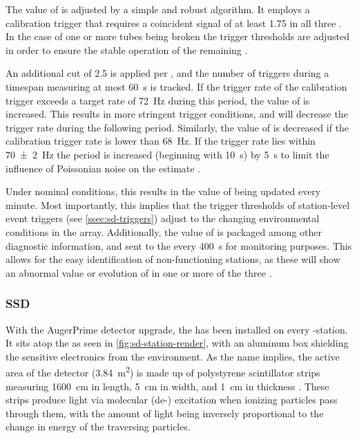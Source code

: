 The value of \VemOnline is adjusted by a simple and robust algorithm. It employs
a calibration trigger that requires a coincident signal of at least 
\SI{1.75}{\VemOnline} in all three \LPMTs. In the case of one or more tubes
being broken the trigger thresholds are adjusted in order to ensure the stable 
operation of the remaining \PMTs 
\cite{convengaLocalStationCalibrationDummies2023}.

An additional cut of \SI{2.5}{\VemOnline} is applied per \LPMT, and the number 
of triggers during a timespan measuring at most \SI{60}{\second} is tracked. If
the trigger rate of the calibration trigger exceeds a target rate of 
\SI{72}{\hertz} during this period, the value of \VemOnline is increased. This 
results in more stringent trigger conditions, and will decrease the trigger rate
during the following \DAQ period. Similarly, the value of \VemOnline is 
decreased if the calibration trigger rate is lower than \SI{68}{\hertz}. If the 
trigger rate lies within \SI{70\pm2}{\hertz} the \DAQ period is increased 
(beginning with \SI{10}{\second}) by \SI{5}{\second} to limit the influence of 
Poissonian noise on the estimate \cite{bertouCalibrationSurfaceArray2006, 
convengaLocalStationCalibrationDummies2023}.

Under nominal conditions, this results in the value of \VemOnline being updated
every minute. Most importantly, this implies that the trigger thresholds of 
station-level event triggers (see \cref{ssec:sd-triggers}) adjust to the
changing environmental conditions in the array. Additionally, the value of 
\VemOnline is packaged among other diagnostic information, and sent to the \CDAS
every \SI{400}{\second} for monitoring purposes. This allows for the easy 
identification of non-functioning stations, as these will show an abnormal value
or evolution of \VemOnline in one or more of the three \LPMTs. 

\subsubsection{\acf{SSD}}

With the AugerPrime detector upgrade, the \SSD has been installed on every 
\SD-station. It sits atop the \WCD as seen in \cref{fig:sd-station-render}, with
an aluminum box shielding the sensitive electronics from the environment. As the
name implies, the active area of the detector (\SI{3.84}{\meter\squared}) is 
made up of polystyrene scintillator strips measuring \SI{1600}{\centi\meter} in 
length, \SI{5}{\centi\meter} in width, and \SI{1}{\centi\meter} in thickness 
\cite{cataldiUpgradePierreAuger2022}. These strips produce light via molecular 
(de-) excitation when ionizing particles pass through them, with the amount of
light being inversely proportional to the change in energy of the traversing 
particles.

